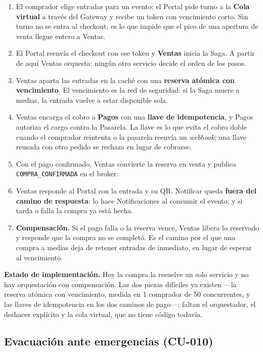\begin{enumerate}
\item El comprador elige entradas para un evento; el Portal pide turno a la \textbf{Cola virtual}
a través del Gateway y recibe un token con vencimiento corto. Sin turno no se entra al checkout:
es lo que impide que el pico de una apertura de venta llegue entero a Ventas.
\item El Portal reenvía el checkout con ese token y \textbf{Ventas} inicia la Saga. A partir de
aquí Ventas orquesta: ningún otro servicio decide el orden de los pasos.
\item Ventas aparta las entradas en la caché con una \textbf{reserva atómica con vencimiento}. El
vencimiento es la red de seguridad: si la Saga muere a medias, la entrada vuelve a estar
disponible sola.
\item Ventas encarga el cobro a \textbf{Pagos} con una \textbf{llave de idempotencia}, y Pagos
autoriza el cargo contra la Pasarela. La llave es lo que evita el cobro doble cuando el comprador
reintenta o la pasarela reenvía un \textit{webhook}; una llave reusada con otro pedido se rechaza
en lugar de cobrarse.
\item Con el pago confirmado, Ventas convierte la reserva en venta y publica
\texttt{COMPRA\_CONFIRMADA} en el broker.
\item Ventas responde al Portal con la entrada y su QR. Notificar queda \textbf{fuera del camino
de respuesta}: lo hace Notificaciones al consumir el evento, y si tarda o falla la compra ya está
hecha.
\item \textbf{Compensación.} Si el pago falla o la reserva vence, Ventas libera lo reservado y
responde que la compra no se completó. Es el camino por el que una compra a medias deja de retener
entradas de inmediato, en lugar de esperar al vencimiento.
\end{enumerate}

\medskip
\noindent\textbf{Estado de implementación.} Hoy la compra la resuelve un solo servicio y no hay
orquestación con compensación. Las dos piezas difíciles ya existen —la reserva atómica con
vencimiento, medida en 1 comprador de 50 concurrentes, y las llaves de idempotencia en los dos
caminos de pago—; faltan el orquestador, el deshacer explícito y la cola virtual, que no tiene
código todavía.

\subsection{Evacuación ante emergencias (CU-010)}

